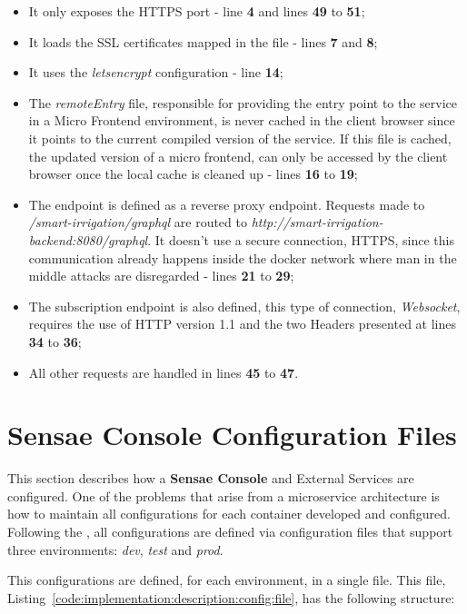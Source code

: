 \begin{itemize}
    \item It only exposes the HTTPS port - line \textbf{4} and lines \textbf{49} to \textbf{51};
    \item It loads the SSL certificates mapped in the  file - lines \textbf{7} and \textbf{8};
    \item It uses the \textit{letsencrypt} configuration - line \textbf{14};
    \item The \textit{remoteEntry} file, responsible for providing the entry point to the service in a Micro Frontend environment, is never cached in the client browser since it points to the current compiled version of the service. If this file is cached, the updated version of a micro frontend, can only be accessed by the client browser once the local cache is cleaned up - lines \textbf{16} to \textbf{19};
    \item The  endpoint is defined as a reverse proxy endpoint. Requests made to \textit{/smart-irrigation/graphql} are routed to \textit{http://smart-irrigation-backend:8080/graphql}. It doesn't use a secure connection, HTTPS, since this communication already happens inside the docker network where man in the middle attacks are disregarded - lines \textbf{21} to \textbf{29};
    \item The  subscription endpoint is also defined, this type of connection, \textit{Websocket}, requires the use of HTTP version 1.1 and the two Headers presented at lines \textbf{34} to \textbf{36};
    \item All other requests are handled in lines \textbf{45} to \textbf{47}.
\end{itemize}

\section{Sensae Console Configuration Files}
\label{subsec:implementation:description:config}

This section describes how a \textbf{Sensae Console} and External Services are configured. One of the problems that arise from a microservice architecture is how to maintain all configurations for each container developed and configured. Following the , all configurations are defined via configuration files that support three environments: \textit{dev}, \textit{test} and \textit{prod}.

This configurations are defined, for each environment, in a single file. This file, Listing~\ref{code:implementation:description:config:file}, has the following structure:

